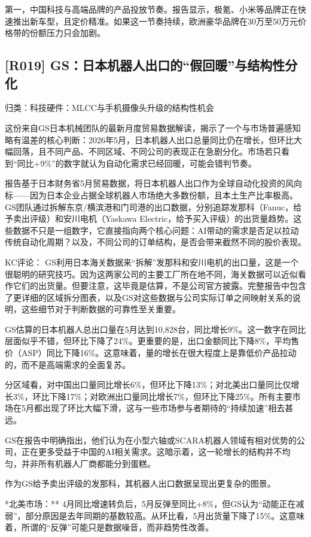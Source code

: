 \documentclass[11pt]{ctexart}
\begin{document}
第一，中国科技与高端品牌的产品投放节奏。报告显示，极氪、小米等品牌正在快速推出新车型，且定价精准。如果这一节奏持续，欧洲豪华品牌在30万至50万元价格带的份额压力只会加剧。

\subsection{[R019] GS：日本机器人出口的“假回暖”与结构性分化}
{\small\color{refgray}归类：科技硬件：MLCC与手机摄像头升级的结构性机会}

这份来自GS日本机械团队的最新月度贸易数据解读，揭示了一个与市场普遍感知略有温差的核心判断：2026年5月，日本机器人出口总量同比仍在增长，但环比大幅回落，且不同产品、不同区域、不同公司的表现正在急剧分化。市场若只看到“同比+9\%”的数字就认为自动化需求已经回暖，可能会错判节奏。

报告基于日本财务省5月贸易数据，将日本机器人出口作为全球自动化投资的风向标——因为日本企业占据全球机器人市场绝大多数份额，且本土生产比率极高。GS团队通过拆解东京/横滨港和门司港的出口数据，分别追踪发那科（Fanuc，给予卖出评级）和安川电机（Yaskawa Electric，给予买入评级）的出货量趋势。这些数据不只是一组数字，它直接指向两个核心问题：AI带动的需求是否足以拉动传统自动化周期？以及，不同公司的订单结构，是否会带来截然不同的股价表现。

KC评论： GS利用日本海关数据来“拆解”发那科和安川电机的出口量，这是一个很聪明的研究技巧。因为这两家公司的主要工厂所在地不同，海关数据可以近似看作它们的出货量。但要注意，这毕竟是估算，不是公司官方披露。完整报告中包含了更详细的区域拆分图表，以及GS对这些数据与公司实际订单之间映射关系的说明，这些细节对于判断数据的可靠性至关重要。

GS估算的日本机器人总出口量在5月达到10,828台，同比增长9\%。这一数字在同比层面似乎不错，但环比下降了24\%。更重要的是，出口金额同比下降8\%，平均售价（ASP）同比下降16\%。这意味着，量的增长在很大程度上是靠低价产品拉动的，而不是高端需求的全面复苏。

分区域看，对中国出口量同比增长6\%，但环比下降13\%；对北美出口量同比仅增长3\%，环比下降17\%；对欧洲出口量同比增长7\%，但环比下降25\%。所有主要市场在5月都出现了环比大幅下滑，这与一些市场参与者期待的“持续加速”相去甚远。

GS在报告中明确指出，他们认为在小型六轴或SCARA机器人领域有相对优势的公司，正在更多受益于中国的AI相关需求。这暗示着，这一轮增长的结构并不均匀，并非所有机器人厂商都能分到蛋糕。

作为GS给予卖出评级的发那科，其机器人出口数据呈现出更复杂的图景。

*北美市场：** 4月同比增速转负后，5月反弹至同比+8\%，但GS认为“动能正在减弱”，部分原因是去年同期的基数较高。从环比看，5月出货量下降了15\%。这意味着，所谓的“反弹”可能只是数据噪音，而非趋势性改善。
\end{document}

